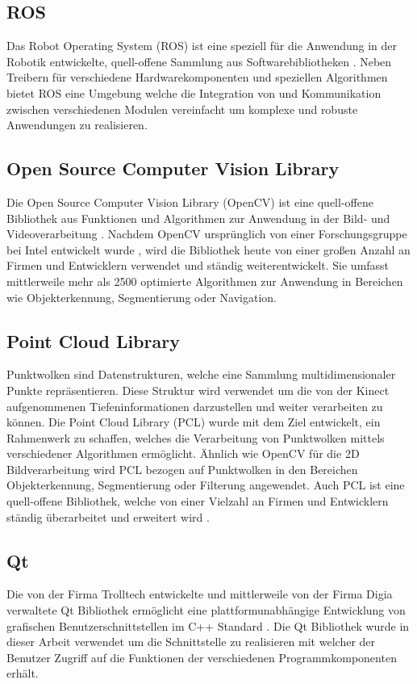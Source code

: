\subsection{ROS}
\label{chap:ros}
Das Robot Operating System (ROS) ist eine speziell für die Anwendung in der Robotik entwickelte, quell-offene Sammlung aus Softwarebibliotheken \cite{ROS}. Neben Treibern für verschiedene Hardwarekomponenten und speziellen Algorithmen bietet ROS eine Umgebung welche die Integration von und Kommunikation zwischen verschiedenen Modulen vereinfacht um komplexe und robuste Anwendungen zu realisieren. 

\subsection{Open Source Computer Vision Library}
Die Open Source Computer Vision Library (OpenCV) ist eine quell-offene Bibliothek aus Funktionen und Algorithmen zur Anwendung in der Bild- und Videoverarbeitung \cite{OpenCV}. Nachdem OpenCV ursprünglich von einer Forschungsgruppe bei Intel entwickelt wurde \cite{Laganiere2011}, wird die Bibliothek heute von einer großen Anzahl an Firmen und Entwicklern verwendet und ständig weiterentwickelt. Sie umfasst mittlerweile mehr als 2500 optimierte Algorithmen zur Anwendung in Bereichen wie Objekterkennung, Segmentierung oder Navigation.

\subsection{Point Cloud Library}
Punktwolken sind Datenstrukturen, welche eine Sammlung multidimensionaler Punkte repräsentieren. Diese Struktur wird verwendet um die von der Kinect aufgenommenen Tiefeninformationen darzustellen und weiter verarbeiten zu können. Die Point Cloud Library (PCL) wurde mit dem Ziel entwickelt, ein Rahmenwerk zu schaffen, welches die Verarbeitung von Punktwolken mittels verschiedener Algorithmen ermöglicht. Ähnlich wie OpenCV für die 2D Bildverarbeitung wird PCL bezogen auf Punktwolken in den Bereichen Objekterkennung, Segmentierung oder Filterung angewendet. Auch PCL ist eine quell-offene Bibliothek, welche von einer Vielzahl an Firmen und Entwicklern ständig überarbeitet und erweitert wird \cite{PCL}.

\subsection{Qt}
Die von der Firma Trolltech entwickelte und mittlerweile von der Firma Digia verwaltete Qt Bibliothek ermöglicht eine plattformunabhängige Entwicklung von grafischen Benutzerschnittstellen im C++ Standard \cite{Qt}. Die Qt Bibliothek wurde in dieser Arbeit verwendet um die Schnittstelle zu realisieren mit welcher der Benutzer Zugriff auf die Funktionen der verschiedenen Programmkomponenten erhält.

